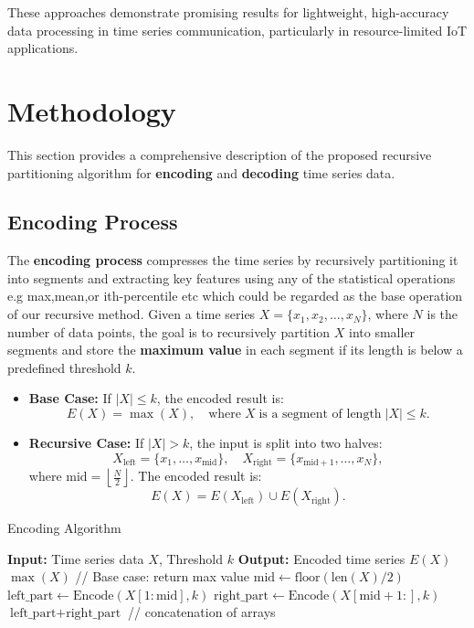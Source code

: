 \documentclass[onecolumn,conference]{IEEEtran}
\begin{document}
These approaches demonstrate promising results for lightweight, high-accuracy data processing in time series communication, particularly in resource-limited IoT applications.
\section{Methodology}
This section provides a comprehensive description of the proposed recursive partitioning algorithm for \textbf{encoding} and \textbf{decoding} time series data.

\subsection{Encoding Process}
The \textbf{encoding process} compresses the time series by recursively partitioning it into segments and extracting key features using any of the statistical operations e.g max,mean,or ith-percentile etc which could be regarded as the base operation of our recursive method.
\newline
Given a time series \( X = \{x_1, x_2, \dots, x_N\} \), where \( N \) is the number of data points, the goal is to recursively partition \( X \) into smaller segments and store the \textbf{maximum value} in each segment if its length is below a predefined threshold \( k \).
\begin{itemize}
    \item \textbf{Base Case:} If \( |X| \leq k \), the encoded result is:
    \[
    E(X) = \max(X), \quad \text{where} \; X \; \text{is a segment of length} \; |X| \leq k.
    \]
    \item \textbf{Recursive Case:} If \( |X| > k \), the input is split into two halves:
    \[
    X_{\text{left}} = \{x_1, \dots, x_{\text{mid}}\}, \quad X_{\text{right}} = \{x_{\text{mid}+1}, \dots, x_N\},
    \]
    where \( \text{mid} = \left\lfloor \frac{N}{2} \right\rfloor \). The encoded result is:
    \[
    E(X) = E(X_{\text{left}}) \cup E(X_{\text{right}}).
    \]
\end{itemize}

\begin{algorithm}[H] %
\caption{Encoding Algorithm}
\label{alg:encoding}
\begin{algorithmic}[1]
\STATE \textbf{Input:} Time series data $X$, Threshold $k$
\STATE \textbf{Output:} Encoded time series $E(X)$
\STATE
{}
    \RETURN $\max(X)$ \hfill // Base case: return max value
\ENDIF
\STATE $\text{mid} \gets \text{floor}(\text{len}(X)/2)$
\STATE $\text{left\_part} \gets \text{Encode}(X[1:\text{mid}], k)$
\STATE $\text{right\_part} \gets \text{Encode}(X[\text{mid}+1:], k)$
\RETURN $\text{left\_part} + \text{right\_part}$ // concatenation of arrays
\end{algorithmic}
\end{algorithm}
\end{document}

